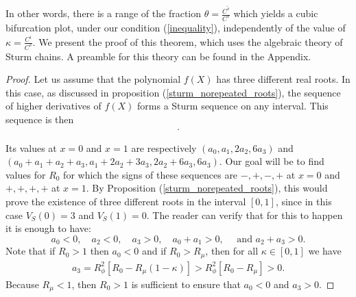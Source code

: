 \documentclass[sn-basic]{sn-jnl}%
\theoremstyle{thmstyleone}%
\theoremstyle{thmstyletwo}%
\theoremstyle{thmstylethree}%
\newcommand{\ws}{\widetilde{s}}
\begin{document}
In other words, there is a range of the fraction $\theta = \frac{C^{\ws}}{C^s}$ which yields a cubic bifurcation plot, under our condition (\ref{inequality}), independently of the value of $\kappa = \frac{C^i}{C^s}$. We present the proof of this theorem, which uses the algebraic theory of Sturm chains. A preamble for this theory can be found in the Appendix.

\begin{proof}

Let us assume that the polynomial $f(X)$ has three different real roots. In this case, as discussed in proposition (\ref{sturm_norepeated_roots}), the sequence of higher derivatives of $f(X)$ forms a Sturm sequence on any interval. This sequence is then
\begin{align*}
    [a_0 + a_1 X + a_2 X^2 + a_3 X^3, 
    a_1 + 2a_2X + 3a_3X^2, 2a_2 + 6a_3X, 6a_3].
\end{align*}

Its values at $x=0$ and $x = 1$ are respectively $(a_0,a_1,2a_2,6a_3)$ and $(a_0 + a_1 + a_2 + a_3, a_1 + 2a_2 + 3a_3, 2a_2 + 6a_3, 6a_3)$. Our goal will be to find values for $R_0$ for which the signs of these sequences are $-,+,-,+$ at $x=0$ and $+,+,+,+$ at $x=1$. By Proposition (\ref{sturm_norepeated_roots}), this would prove the existence of three different roots in the interval $[0,1]$, since in this case $V_S(0)=3$ and $V_S(1)=0$. The reader can verify that for this to happen it is enough to have:
\begin{equation}\label{ineq_needed}
    a_0 < 0, \quad a_2 < 0, \quad a_3 > 0, \quad a_0 + a_1 > 0, \quad \text{ and } a_2 + a_3 > 0.
\end{equation}
Note that if $R_0>1$ then $a_0 < 0$ and if $R_0 > R_\mu$, then for all $\kappa \in [0,1]$ we have 
\begin{align*}
    a_3 = R_\phi^2 [ R_0 - R_\mu(1-\kappa)] > R_\phi^2 [ R_0 - R_\mu] > 0.
\end{align*}
Because $R_\mu < 1$, then $R_0>1$ is sufficient to ensure that $a_0 < 0$ and $a_3 > 0$. 


\end{proof}
\end{document}
